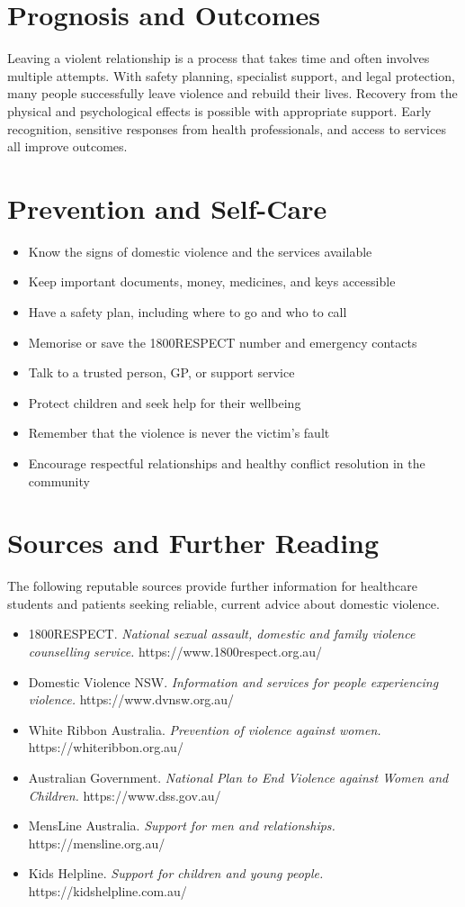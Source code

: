 \section*{Prognosis and Outcomes}
Leaving a violent relationship is a process that takes time and often involves multiple attempts. With safety planning, specialist support, and legal protection, many people successfully leave violence and rebuild their lives. Recovery from the physical and psychological effects is possible with appropriate support. Early recognition, sensitive responses from health professionals, and access to services all improve outcomes.

\section*{Prevention and Self-Care}
\begin{itemize}
    \item Know the signs of domestic violence and the services available
    \item Keep important documents, money, medicines, and keys accessible
    \item Have a safety plan, including where to go and who to call
    \item Memorise or save the 1800RESPECT number and emergency contacts
    \item Talk to a trusted person, GP, or support service
    \item Protect children and seek help for their wellbeing
    \item Remember that the violence is never the victim's fault
    \item Encourage respectful relationships and healthy conflict resolution in the community
\end{itemize}

\section*{Sources and Further Reading}
The following reputable sources provide further information for healthcare students and patients seeking reliable, current advice about domestic violence.

\begin{itemize}
    \item 1800RESPECT. \textit{National sexual assault, domestic and family violence counselling service.} https://www.1800respect.org.au/
    \item Domestic Violence NSW. \textit{Information and services for people experiencing violence.} https://www.dvnsw.org.au/
    \item White Ribbon Australia. \textit{Prevention of violence against women.} https://whiteribbon.org.au/
    \item Australian Government. \textit{National Plan to End Violence against Women and Children.} https://www.dss.gov.au/
    \item MensLine Australia. \textit{Support for men and relationships.} https://mensline.org.au/
    \item Kids Helpline. \textit{Support for children and young people.} https://kidshelpline.com.au/
\end{itemize}
